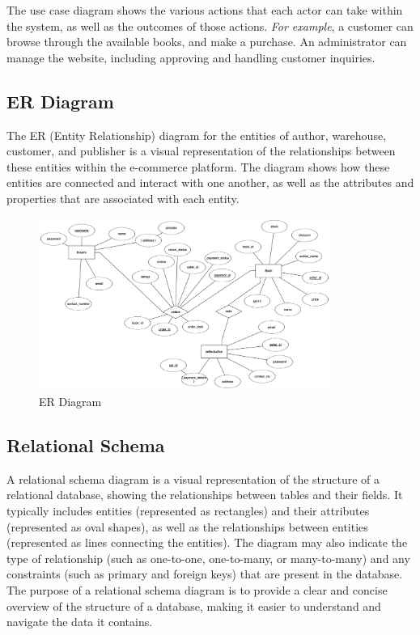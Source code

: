 \documentclass[12pt]{article}
\begin{document}
The use case diagram shows the various actions that each actor can take within the system, as well as the outcomes of those actions. \textit{For example}, a customer can browse through the available books, and make a purchase. An administrator can manage the website, including approving and handling customer inquiries.

\newpage
\subsection{ER Diagram}

The ER (Entity Relationship) diagram for the entities of author, warehouse, customer, and publisher is a visual representation of the relationships between these entities within the e-commerce platform. The diagram shows how these entities are connected and interact with one another, as well as the attributes and properties that are associated with each entity.

\begin{figure}[h]
\centering
\includegraphics[width=0.85\textwidth]{er_diagram.png}
\caption{ER Diagram}
\end{figure}

\newpage
\subsection{Relational Schema}

A relational schema diagram is a visual representation of the structure of a relational database, showing the relationships between tables and their fields. It typically includes entities (represented as rectangles) and their attributes (represented as oval shapes), as well as the relationships between entities (represented as lines connecting the entities). The diagram may also indicate the type of relationship (such as one-to-one, one-to-many, or many-to-many) and any constraints (such as primary and foreign keys) that are present in the database. The purpose of a relational schema diagram is to provide a clear and concise overview of the structure of a database, making it easier to understand and navigate the data it contains.
\end{document}
